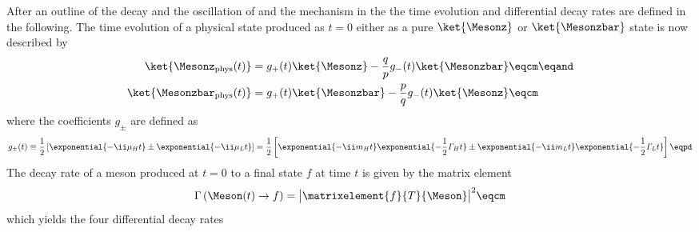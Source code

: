 After an outline of the decay and the oscillation of \Bmesons and the \CKM
mechanism in the \SM the time evolution and differential decay rates are defined
in the following. The time evolution of a physical state produced as $t=0$
either as a pure $\ket{\Mesonz}$ or $\ket{\Mesonzbar}$ state is now described by
%
\begin{equation}
  \begin{split}
    \ket{\Mesonz_{\text{phys}} (t)}    &= g_{+}(t) \ket{\Mesonz}    - \frac{q}{p} g_{-}(t) \ket{\Mesonzbar} \eqcm \eqand\\
    \ket{\Mesonzbar_{\text{phys}} (t)} &= g_{+}(t) \ket{\Mesonzbar} - \frac{p}{q} g_{-}(t) \ket{\Mesonz}    \eqcm
  \end{split}
\end{equation}
%
where the coefficients $g_{\pm}$ are defined as
%
\begin{equation}
  g_{\pm}(t) \equiv 
  \frac{1}{2} \left[
    \exponential{-\ii \mu_H t} \pm \exponential{-\ii \mu_L t}
  \right]
  =
  \frac{1}{2} \left[
    \exponential{-\ii m_H t} \exponential{-\frac{1}{2} \mathit{\Gamma}_H t} \pm \exponential{-\ii m_L t} \exponential{-\frac{1}{2} \mathit{\Gamma}_L t}
  \right]\eqpd
\end{equation}
%
The decay rate of a meson produced at $t=0$ to a final state $f$ at time $t$
is given by the matrix element
%
\begin{equation}
  \Gamma \left(\Meson(t)\to f\right)= \bigl\vert \matrixelement{f}{T}{\Meson} \bigr\vert^2 \eqcm
\end{equation}
%
which yields the four differential decay rates  
%
